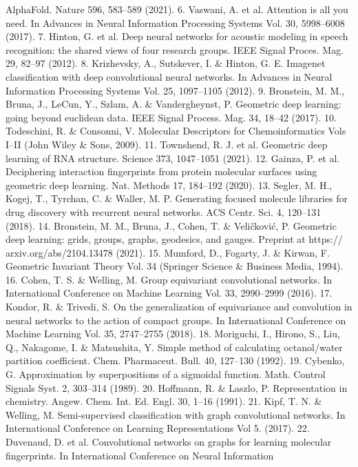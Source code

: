 AlphaFold. Nature 596, 583–589 (2021).
	6.
Vaswani, A. et al. Attention is all you need. In Advances in Neural
Information Processing Systems Vol. 30, 5998–6008 (2017).
	7.
Hinton, G. et al. Deep neural networks for acoustic modeling in speech
recognition: the shared views of four research groups. IEEE Signal Proces.
Mag. 29, 82–97 (2012).
	8.
Krizhevsky, A., Sutskever, I. \& Hinton, G. E. Imagenet classification with
deep convolutional neural networks. In Advances in Neural Information
Processing Systems Vol. 25, 1097–1105 (2012).
	9.
Bronstein, M. M., Bruna, J., LeCun, Y., Szlam, A. \& Vandergheynst, P.
Geometric deep learning: going beyond euclidean data. IEEE Signal Process.
Mag. 34, 18–42 (2017).
	10.
Todeschini, R. \& Consonni, V. Molecular Descriptors for Chemoinformatics
Vols I–II (John Wiley \& Sons, 2009).
	11.
Townshend, R. J. et al. Geometric deep learning of RNA structure. Science
373, 1047–1051 (2021).
	12.
Gainza, P. et al. Deciphering interaction fingerprints from protein molecular
surfaces using geometric deep learning. Nat. Methods 17, 184–192 (2020).
	13.
Segler, M. H., Kogej, T., Tyrchan, C. \& Waller, M. P. Generating focused
molecule libraries for drug discovery with recurrent neural networks. ACS
Centr. Sci. 4, 120–131 (2018).
	14.
Bronstein, M. M., Bruna, J., Cohen, T. \& Veličković, P. Geometric deep
learning: grids, groups, graphs, geodesics, and gauges. Preprint at https://
arxiv.org/abs/2104.13478 (2021).
	15.
Mumford, D., Fogarty, J. \& Kirwan, F. Geometric Invariant Theory Vol. 34
(Springer Science \& Business Media, 1994).
	16.
Cohen, T. S. \& Welling, M. Group equivariant convolutional networks. In
International Conference on Machine Learning Vol. 33, 2990–2999 (2016).
	17.
Kondor, R. \& Trivedi, S. On the generalization of equivariance and
convolution in neural networks to the action of compact groups. In
International Conference on Machine Learning Vol. 35, 2747–2755 (2018).
	18.
Moriguchi, I., Hirono, S., Liu, Q., Nakagome, I. \& Matsushita, Y. Simple
method of calculating octanol/water partition coefficient. Chem.
Pharmaceut. Bull. 40, 127–130 (1992).
	19.
Cybenko, G. Approximation by superpositions of a sigmoidal function.
Math. Control Signals Syst. 2, 303–314 (1989).
	20.
Hoffmann, R. \& Laszlo, P. Representation in chemistry. Angew. Chem. Int.
Ed. Engl. 30, 1–16 (1991).
	21.
Kipf, T. N. \& Welling, M. Semi-supervised classification with graph
convolutional networks. In International Conference on Learning
Representations Vol 5. (2017).
	22.
Duvenaud, D. et al. Convolutional networks on graphs for learning
molecular fingerprints. In International Conference on Neural Information
